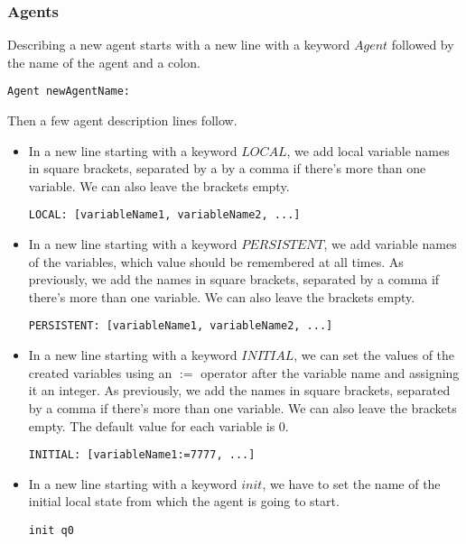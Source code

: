 \documentclass[12pt]{article}
\begin{document}
\subsubsection{Agents}
Describing a new agent starts with a new line with a keyword $Agent$ followed by the name of the agent and a colon.
\begin{lstlisting}[title={Creating an agent with a name "newAgentName".}]
  Agent newAgentName:
\end{lstlisting}
Then a few agent description lines follow.
\begin{itemize}
  \item In a new line starting with a keyword $LOCAL$, we add local variable names in square brackets, separated by a by a comma if there's more than one variable. We can also leave the brackets empty.
  \begin{lstlisting}[title={Creating local variables named "variableName1", "variableName2".}]
    LOCAL: [variableName1, variableName2, ...]
  \end{lstlisting}
  \item In a new line starting with a keyword $PERSISTENT$, we add variable names of the variables, which value should be remembered at all times. As previously, we add the names in square brackets, separated by a comma if there's more than one variable. We can also leave the brackets empty.
  \begin{lstlisting}[title={Making local variables named "variableName1", "variableName2" and so on, persistent.}]
    PERSISTENT: [variableName1, variableName2, ...]
  \end{lstlisting}
  \item In a new line starting with a keyword $INITIAL$, we can set the values of the created variables using an $:=$ operator after the variable name and assigning it an integer. As previously, we add the names in square brackets, separated by a comma if there's more than one variable. We can also leave the brackets empty. The default value for each variable is 0.
  \begin{lstlisting}[title={Setting a value 7777 to the "variableName1" variable and so on.}]
    INITIAL: [variableName1:=7777, ...]
  \end{lstlisting}
  \item In a new line starting with a keyword $init$, we have to set the name of the initial local state from which the agent is going to start.
  \begin{lstlisting}[title={Setting the "q0" as the initial state in the local model.}]
    init q0
  \end{lstlisting}
\end{itemize}
\end{document}
